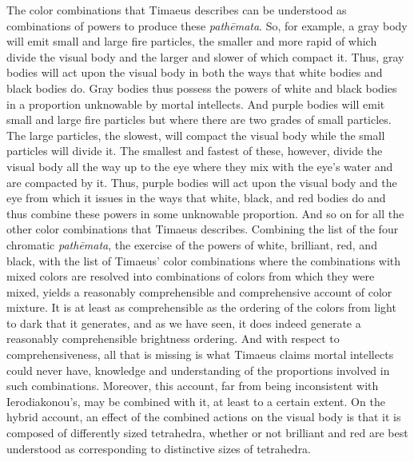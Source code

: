 The color combinations that Timaeus describes can be understood as combinations of powers to produce these \emph{pathēmata}. So, for example, a gray body will emit small and large fire particles, the smaller and more rapid of which divide the visual body and the larger and slower of which compact it. Thus, gray bodies will act upon the visual body in both the ways that white bodies and black bodies do. Gray bodies thus possess the powers of white and black bodies in a proportion unknowable by mortal intellects. And purple bodies will emit small and large fire particles but where there are two grades of small particles. The large particles, the slowest, will compact the visual body while the small particles will divide it. The smallest and fastest of these, however, divide the visual body all the way up to the eye where they mix with the eye's water and are compacted by it. Thus, purple bodies will act upon the visual body and the eye from which it issues in the ways that white, black, and red bodies do and thus combine these powers in some unknowable proportion. And so on for all the other color combinations that Timaeus describes. Combining the list of the four chromatic \emph{pathēmata}, the exercise of the powers of white, brilliant, red, and black, with the list of Timaeus' color combinations where the combinations with mixed colors are resolved into combinations of colors from which they were mixed, yields a reasonably comprehensible and comprehensive account of color mixture. It is at least as comprehensible as the ordering of the colors from light to dark that it generates, and as we have seen, it does indeed generate a reasonably comprehensible brightness ordering. And with respect to comprehensiveness, all that is missing is what Timaeus claims mortal intellects could never have, knowledge and understanding of the proportions involved in such combinations. Moreover, this account, far from being inconsistent with Ierodiakonou's, may be combined with it, at least to a certain extent. On the hybrid account, an effect of the combined actions on the visual body is that it is composed of differently sized tetrahedra, whether or not brilliant and red are best understood as corresponding to distinctive sizes of tetrahedra.

